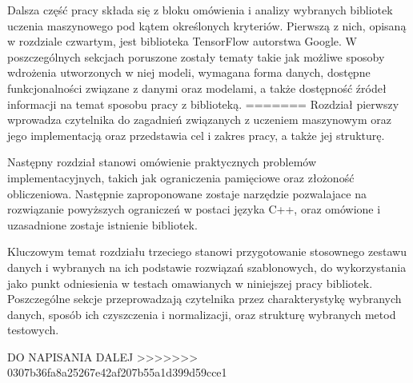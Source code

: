 Dalsza część pracy składa się z bloku omówienia i analizy wybranych bibliotek uczenia maszynowego pod kątem określonych kryteriów. Pierwszą z nich, opisaną w rozdziale czwartym, jest biblioteka TensorFlow autorstwa Google. W poszczególnych sekcjach poruszone zostały tematy takie jak możliwe sposoby wdrożenia utworzonych w niej modeli, wymagana forma danych, dostępne funkcjonalności związane z danymi oraz modelami, a także dostępność źródeł informacji na temat sposobu pracy z biblioteką.  
=======
Rozdział pierwszy wprowadza czytelnika do zagadnień związanych z uczeniem maszynowym oraz jego implementacją oraz przedstawia cel i zakres pracy, a także jej strukturę.

Następny rozdział stanowi omówienie praktycznych problemów implementacyjnych, takich jak ograniczenia pamięciowe oraz złożoność obliczeniowa. Następnie zaproponowane zostaje narzędzie pozwalajace na rozwiązanie powyższych ograniczeń w postaci języka C++, oraz omówione i uzasadnione zostaje istnienie bibliotek. 

Kluczowym temat rozdziału trzeciego stanowi przygotowanie stosownego zestawu danych i wybranych na ich podstawie rozwiązań szablonowych, do wykorzystania jako punkt odniesienia w testach omawianych w niniejszej pracy bibliotek. Poszczególne sekcje przeprowadzają czytelnika przez charakterystykę wybranych danych, sposób ich czyszczenia i normalizacji, oraz strukturę wybranych metod testowych. 

DO NAPISANIA DALEJ
>>>>>>> 0307b36fa8a25267e42af207b55a1d399d59cce1
